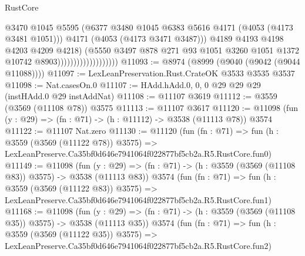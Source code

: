 \begin{lexlean}{RustCore}
\begin{coremodule}
                                            @3470
                                            @1045
                                            @5595
                                            (@6377
                                              @3480
                                              @1045
                                              @6383
                                              @5616
                                              @4171
                                              (@4053 (@4173 @3481 @1051)))
                                            @4171
                                            (@4053 (@4173 @3471 @3487)))
                                          @4189
                                          @4193
                                          @4198
                                          @4203
                                          @4209
                                          @4218)
                                        (@5550
                                          @3497
                                          @878
                                          @271
                                          @93
                                          @1051
                                          @3260
                                          @1051
                                          @1372
                                          @10742
                                          @8903)))))))))))))))))))
@11093 := @8974 (@8999 (@9040 (@9042 (@9044 @11088))))
@11097 := LexLeanPreservation.Rust.CrateOK @3533 @3535 @3537
@11098 := Nat.casesOn.{0}
@11107 := HAdd.hAdd.{0, 0, 0} @29 @29 @29 (instHAdd.{0} @29 instAddNat)
@11108 := @11107 @3619
@11112 := @3559 (@3569 (@11108 @78)) @3575
@11113 := @11107 @3617
@11120 := @11098 (fun (y : @29) => (fn : @71) -> (h : @11112) -> @3538 (@11113 @78)) @3574
@11122 := @11107 Nat.zero
@11130 := @11120
    (fun (fn : @71) =>
    fun (h : @3559 (@3569 (@11122 @78)) @3575) =>
    LexLeanPreserve.Ca35bf0d646e7941064f022877bf5cb2a.R5.RustCore.fun0)
@11149 := @11098
    (fun (y : @29) => (fn : @71) -> (h : @3559 (@3569 (@11108 @83)) @3575) -> @3538 (@11113 @83))
    @3574
    (fun (fn : @71) =>
    fun (h : @3559 (@3569 (@11122 @83)) @3575) =>
    LexLeanPreserve.Ca35bf0d646e7941064f022877bf5cb2a.R5.RustCore.fun1)
@11168 := @11098
    (fun (y : @29) => (fn : @71) -> (h : @3559 (@3569 (@11108 @35)) @3575) -> @3538 (@11113 @35))
    @3574
    (fun (fn : @71) =>
    fun (h : @3559 (@3569 (@11122 @35)) @3575) =>
    LexLeanPreserve.Ca35bf0d646e7941064f022877bf5cb2a.R5.RustCore.fun2)

\end{coremodule}
\end{lexlean}

